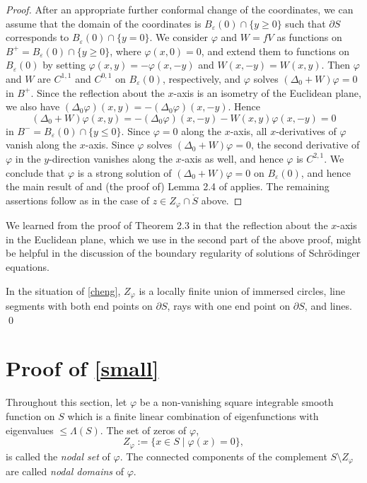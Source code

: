 \begin{proof}
After an appropriate further conformal change of the coordinates,
we can assume that the domain of the coordinates is $B_{\varepsilon}(0)\cap\{y\ge0\}$
such that $\partial S$ corresponds to $B_{\varepsilon}(0)\cap\{y=0\}$.
We consider ${\varphi}$ and $W=fV$ as functions on $B^+=B_{\varepsilon}(0)\cap\{y\ge0\}$,
where ${\varphi}(x,0)=0$, and extend them to functions on $B_{\varepsilon}(0)$
by setting ${\varphi}(x,y)=-{\varphi}(x,-y)$ and $W(x,-y)=W(x,y)$.
Then ${\varphi}$ and $W$ are $C^{1,1}$ and $C^{0,1}$ on $B_{\varepsilon}(0)$, respectively,
and ${\varphi}$ solves $(\Delta_0+W){\varphi}=0$ in $B^+$.
Since the reflection about the $x$-axis is an isometry of the Euclidean plane,
we also have $(\Delta_0{\varphi})(x,y)=-(\Delta_0{\varphi})(x,-y)$.
Hence
\begin{equation*}
  (\Delta_0+W){\varphi}(x,y) = -(\Delta_0{\varphi})(x,-y) - W(x,y){\varphi}(x,-y) = 0
\end{equation*}
in $B^-=B_{\varepsilon}(0)\cap\{y\le0\}$.
Since ${\varphi}=0$ along the $x$-axis, all $x$-derivatives of ${\varphi}$ vanish along the $x$-axis.
Since ${\varphi}$ solves $(\Delta_0+W){\varphi}=0$,
the second derivative of ${\varphi}$ in the $y$-direction vanishes along the $x$-axis as well,
and hence ${\varphi}$ is $C^{2,1}$.
We conclude that ${\varphi}$ is a strong solution of $(\Delta_0+W){\varphi}=0$ on $B_{\varepsilon}(0)$,
and hence the main result of \cite{Be} and (the proof of)  Lemma 2.4 of \cite{Che} applies.
The remaining assertions follow as in the case of $z\in Z_{\varphi}\cap\mathring S$ above.
\end{proof}

We learned from the proof of Theorem 2.3 in \cite{HHT} that the reflection
about the $x$-axis in the Euclidean plane,
which we use in the second part of the above proof,
might be helpful in the discussion of the boundary regularity
of solutions of Schr\"odinger equations.

\begin{cor}\label{cheng2}
In the situation of \cref{cheng},
$Z_{\varphi}$ is a locally finite union of immersed circles,
line segments with both end points on $\partial S$,
rays with one end point on $\partial S$, and lines. \qed
\end{cor}

\section{Proof of \cref{small}}
Throughout this section,
let ${\varphi}$ be a non-vanishing square integrable smooth function on $S$
which is a finite linear combination of eigenfunctions
with eigenvalues $\le\Lambda(S)$.
The set of zeros of ${\varphi}$,
\begin{equation}\label{nodal}
  Z_{\varphi} := \{x\in S\mid {\varphi}(x)=0\},
\end{equation}
is called the {\it nodal set} of ${\varphi}$.
The connected components of the complement $S\setminus Z_{\varphi}$
are called \emph{nodal domains} of ${\varphi}$.

